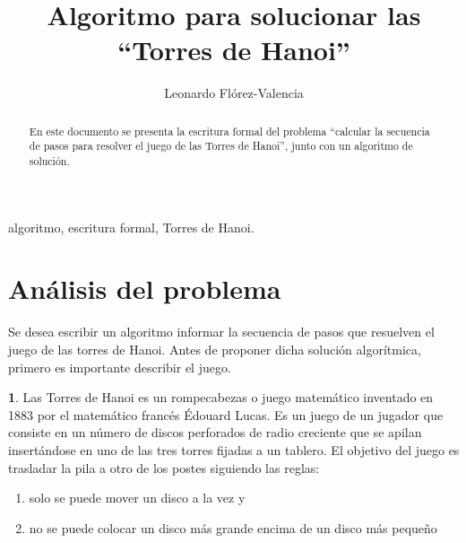 \documentclass[twoside,spanish]{elsarticle}
\theoremstyle{plain}
\theoremstyle{definition}
\newtheorem{defn}[thm]{\protect\definitionname}
\providecommand{\definitionname}{Definición}
\begin{document}
\begin{frontmatter}{}

\title{Algoritmo para solucionar las ``Torres de Hanoi''}


\author[lfv]{Leonardo Flórez-Valencia}


\address[lfv]{Pontificia Universidad Javeriana, Bogotá, Colombia}

\begin{abstract}
En este documento se presenta la escritura formal del problema ``calcular
la secuencia de pasos para resolver el juego de las Torres de Hanoi'',
junto con un algoritmo de solución.
\end{abstract}

\begin{keyword}
algoritmo, escritura formal, Torres de Hanoi.
\end{keyword}

\end{frontmatter}{}

\section{Análisis del problema}

Se desea escribir un algoritmo informar la secuencia de pasos que
resuelven el juego de las torres de Hanoi. Antes de proponer dicha
solución algorítmica, primero es importante describir el juego.

\begin{defn}
Las Torres de Hanoi es un rompecabezas o juego matemático inventado
en 1883 por el matemático francés Édouard Lucas. Es un juego de un
jugador que consiste en un número de discos perforados de radio creciente
que se apilan insertándose en uno de las tres torres fijadas a un
tablero. El objetivo del juego es trasladar la pila a otro de los
postes siguiendo las reglas:
\end{defn}

\begin{enumerate}
\item solo se puede mover un disco a la vez y
\item no se puede colocar un disco más grande encima de un disco más pequeño
\end{enumerate}
\end{document}
